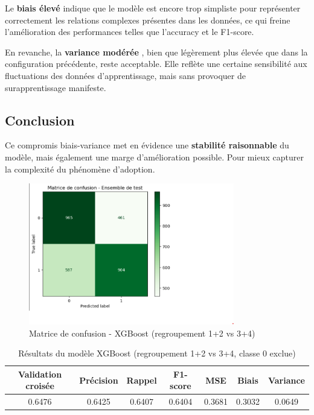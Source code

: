 \documentclass[a4paper,12pt]{article}
\begin{document}
Le \textbf{biais élevé} indique que le modèle est encore trop simpliste pour représenter correctement les relations complexes présentes dans les données, ce qui freine l'amélioration des performances telles que l’accuracy et le F1-score.
 
En revanche, la \textbf{variance modérée} , bien que légèrement plus élevée que dans la configuration précédente, reste acceptable. Elle reflète une certaine sensibilité aux fluctuations des données d’apprentissage, mais sans provoquer de surapprentissage manifeste.
 
\subsection*{Conclusion}
 
Ce compromis biais-variance met en évidence une \textbf{stabilité raisonnable} du modèle, mais également une marge d’amélioration possible. Pour mieux capturer la complexité du phénomène d’adoption.
 
 
\begin{figure}[H]

    \centering

    \includegraphics[width=0.8\textwidth]{XGBOOST1.png}

    \caption{Matrice de confusion - XGBoost (regroupement 1+2 vs 3+4)}

    \label{fig:catboost012_conf}

\end{figure}
 
 
\begin{table}[h]

\centering

\begin{tabular}{|c|c|c|c|c|c|c|}

\hline

\textbf{Validation croisée} & \textbf{Précision} & \textbf{Rappel} & \textbf{F1-score} & \textbf{MSE} & \textbf{Biais} & \textbf{Variance} \\

\hline

0.6476 & 0.6425 & 0.6407 & 0.6404 & 0.3681 & 0.3032 & 0.0649 \\

\hline

\end{tabular}

\caption{Résultats du modèle XGBoost (regroupement 1+2 vs 3+4, classe 0 exclue)}

\end{table}
 
\end{document}
